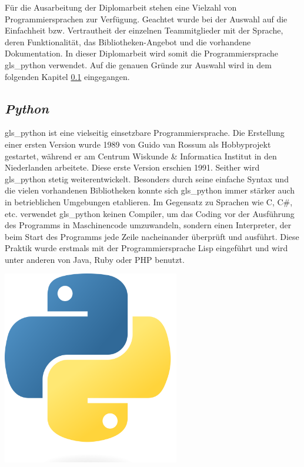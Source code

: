 Für die Ausarbeitung der Diplomarbeit stehen eine Vielzahl von Programmiersprachen zur Verfügung. Geachtet wurde bei der Auswahl auf die Einfachheit bzw. Vertrautheit der einzelnen Teammitglieder mit der Sprache, deren Funktionalität, das Bibliotheken-Angebot und die vorhandene Dokumentation. In dieser Diplomarbeit wird somit die Programmiersprache \gls{gls_python} verwendet. Auf die genauen Gründe zur Auswahl wird in dem folgenden Kapitel \ref{python_kapitel} eingegangen.

\subsection{\textit{Python}}\label{python_kapitel}
\begin{minipage}{0.6\textwidth}
	\gls{gls_python} ist eine vielseitig einsetzbare Programmiersprache. Die Erstellung einer ersten Version wurde 1989 von Guido van Rossum als Hobbyprojekt gestartet, während er am Centrum Wiskunde \& Informatica Institut in den Niederlanden arbeitete. Diese erste Version erschien 1991. Seither wird \gls{gls_python} stetig weiterentwickelt. Besonders durch seine einfache Syntax und die vielen vorhandenen Bibliotheken konnte sich \gls{gls_python} immer stärker auch in betrieblichen Umgebungen etablieren. Im Gegensatz zu Sprachen wie C, C\#, etc. verwendet \gls{gls_python} keinen Compiler, um das Coding vor der Ausführung des Programms in Maschinencode umzuwandeln, sondern einen Interpreter, der beim Start des Programms jede Zeile nacheinander überprüft und ausführt. Diese Praktik wurde erstmals mit der Programmiersprache Lisp eingeführt und wird unter anderen von Java, Ruby oder PHP benutzt. 
	\cite{Python_Software_Foundation:o.J., Pramanick_gfg:2019, Ryte:2021}
\end{minipage}%
\hfill
\begin{minipage}{0.37\textwidth}
	\centering	
	\includegraphics[width=0.58\textwidth]{Bilder/Python_logo}
\end{minipage}
\vspace{1ex}

